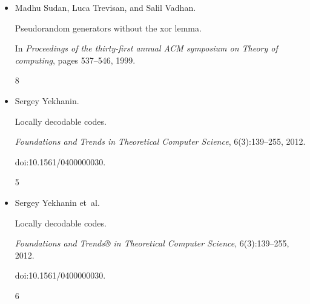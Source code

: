 \begin{itemize}
Daniel A. Spielman.


Linear-time encodable and decodable error-correcting codes.


\emph{IEEE Trans. Inf. Theory}, 42(6):1723–1731, 1996.


doi:10.1109/18.556668.


5, 6




\item[] 
[31]

Madhu Sudan, Luca Trevisan, and Salil Vadhan.


Pseudorandom generators without the xor lemma.


In \emph{Proceedings of the thirty-first annual ACM symposium on
Theory of computing}, pages 537–546, 1999.


8




\item[] 
[32]

Sergey Yekhanin.


Locally decodable codes.


\emph{Foundations and Trends in Theoretical Computer Science},
6(3):139–255, 2012.


doi:10.1561/0400000030.


5




\item[] 
[33]

Sergey Yekhanin et al.


Locally decodable codes.


\emph{Foundations and Trends® in Theoretical Computer
Science}, 6(3):139–255, 2012.


doi:10.1561/0400000030.


6




\end{itemize}

